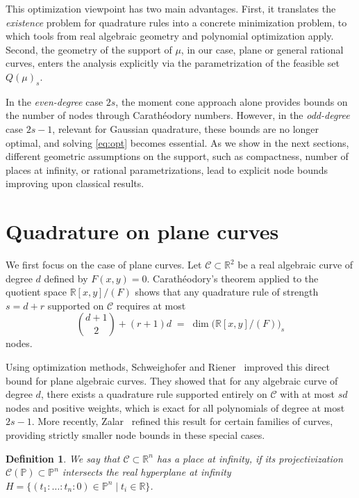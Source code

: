 \documentclass[11pt,a4paper]{amsart}
\numberwithin{equation}{section}
\newtheorem{definition}[thm]{Definition}
\theoremstyle{definition}
\newcommand{\R}{\mathbb{R}}
\numberwithin{thm}{section}
\theoremstyle{break}
\numberwithin{subcase}{case}
\begin{document}
This optimization viewpoint has two main advantages. First, it translates the \emph{existence} problem for quadrature rules into a concrete minimization problem, to which tools from real algebraic geometry and polynomial optimization apply. Second, the geometry of the support of $\mu$, in our case, plane or general rational curves, enters the analysis explicitly via the parametrization of the feasible set $Q(\mu)_s$.  

In the \emph{even-degree} case $2s$, the moment cone approach alone provides bounds on the number of nodes through Carathéodory numbers. However, in the \emph{odd-degree} case $2s-1$, relevant for Gaussian quadrature, these bounds are no longer optimal, and solving \eqref{eq:opt} becomes essential. As we show in the next sections, different geometric assumptions on the support, such as compactness, number of places at infinity, or rational parametrizations, lead to explicit node bounds improving upon classical results.




\section{Quadrature on plane curves}\label{sec:plane}

{We first focus on the case of plane curves. Let $\mathcal{C}\subset \R^2$ be a real algebraic curve of degree $d$ defined by $F(x,y)=0$. Carath\'eodory's theorem applied to the quotient space $\R[x,y]/(F)$ shows that any quadrature rule of strength $s=d+r$ supported on $\mathcal{C}$ requires at most}
\[
\binom{d+1}{2} + (r+1)d \;=\; \dim \bigl(\R[x,y]/(F)\bigr)_{s}
\]
{nodes.}  

Using optimization methods, Schweighofer and Riener~\cite{RS} improved this direct bound for plane algebraic curves. They showed that for any algebraic curve of degree $d$, there exists a quadrature rule supported entirely on $\mathcal{C}$ with at most $sd$ nodes and positive weights, which is exact for all polynomials of degree at most $2s-1$. More recently, Zalar~\cite{zalar} refined this result for certain families of curves, providing strictly smaller node bounds in these special cases.


\begin{definition}
 {We say that $\mathcal C\subset \R^n$ has a place at infinity, if its projectivization $   \mathcal C(\mathbb P)\subset \mathbb P^n$ intersects the real hyperplane at infinity $H=\{(t_1:\dots:t_n:0)\in\mathbb P^n\mid t_i\in \R\} $.  }
\end{definition}
\end{document}
